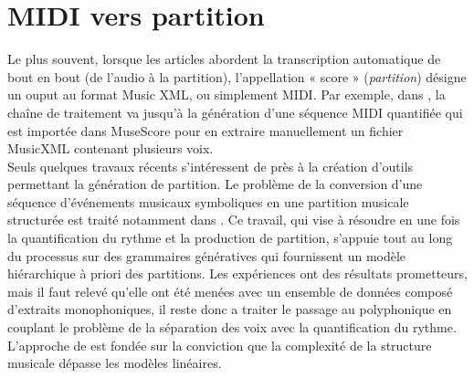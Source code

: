 \section{MIDI vers partition}
Le plus souvent, lorsque les articles abordent la transcription automatique de bout en bout (de l’audio à la partition), l’appellation « score » (\textit{partition}) désigne un ouput au format Music XML, ou simplement MIDI. Par exemple, dans \cite{SHIBATA2021262}, la chaîne de traitement va jusqu’à la génération d’une séquence MIDI quantifiée qui est importée dans MuseScore pour en extraire manuellement un fichier MusicXML contenant plusieurs voix.\\
Seuls quelques travaux récents s’intéressent de près à la création d’outils permettant la génération de partition. Le problème de la conversion d'une séquence d'événements musicaux symboliques en une partition musicale structurée est traité notamment dans \cite{foscarin:hal-01988990}. Ce travail, qui vise à résoudre en une fois la quantification du rythme et la production de partition, s’appuie tout au long du processus sur  des grammaires génératives qui fournissent un modèle hiérarchique à priori des partitions. Les expériences ont des résultats prometteurs, mais il faut relevé qu’elle ont été menées avec un ensemble de données composé d'extraits monophoniques, il reste donc a traiter le passage au polyphonique en couplant le problème de la séparation des voix avec la quantification du rythme.\\
L'approche de \cite{foscarin:hal-01988990} est fondée sur la conviction que la complexité de la structure musicale dépasse les modèles linéaires.
